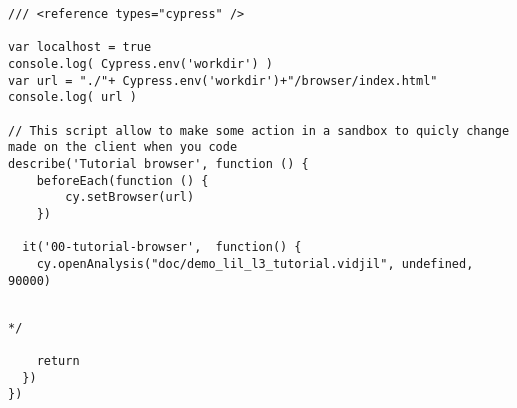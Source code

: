 
\begin{verbatim}
/// <reference types="cypress" />

var localhost = true
console.log( Cypress.env('workdir') )
var url = "./"+ Cypress.env('workdir')+"/browser/index.html"
console.log( url )

// This script allow to make some action in a sandbox to quicly change made on the client when you code
describe('Tutorial browser', function () {
    beforeEach(function () {
        cy.setBrowser(url)
    })

  it('00-tutorial-browser',  function() {
    cy.openAnalysis("doc/demo_lil_l3_tutorial.vidjil", undefined, 90000)


\end{verbatim}










\begin{verbatim}
*/

    return
  })
})

\end{verbatim}


